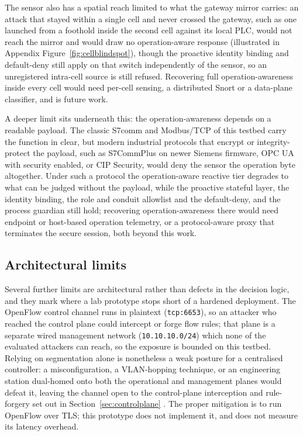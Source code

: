 The sensor also has a spatial reach limited to what the gateway mirror carries: an attack that stayed within a single cell and never crossed the gateway, such as one launched from a foothold inside the second cell against its local PLC, would not reach the mirror and would draw no operation-aware response (illustrated in Appendix Figure~\ref{fig:cellblindspot}), though the proactive identity binding and default-deny still apply on that switch independently of the sensor, so an unregistered intra-cell source is still refused. Recovering full operation-awareness inside every cell would need per-cell sensing, a distributed Snort or a data-plane classifier, and is future work.

A deeper limit sits underneath this: the operation-awareness depends on a readable payload. The classic S7comm and Modbus/TCP of this testbed carry the function in clear, but modern industrial protocols that encrypt or integrity-protect the payload, such as S7CommPlus on newer Siemens firmware, OPC UA with security enabled, or CIP Security, would deny the sensor the operation byte altogether. Under such a protocol the operation-aware reactive tier degrades to what can be judged without the payload, while the proactive stateful layer, the identity binding, the role and conduit allowlist and the default-deny, and the process guardian still hold; recovering operation-awareness there would need endpoint or host-based operation telemetry, or a protocol-aware proxy that terminates the secure session, both beyond this work.

\subsection{Architectural limits}

Several further limits are architectural rather than defects in the decision logic, and they mark where a lab prototype stops short of a hardened deployment. The OpenFlow control channel runs in plaintext (\texttt{tcp:6653}), so an attacker who reached the control plane could intercept or forge flow rules; that plane is a separate wired management network (\texttt{10.10.10.0/24}) which none of the evaluated attackers can reach, so the exposure is bounded on this testbed. Relying on segmentation alone is nonetheless a weak posture for a centralised controller: a misconfiguration, a VLAN-hopping technique, or an engineering station dual-homed onto both the operational and management planes would defeat it, leaving the channel open to the control-plane interception and rule-forgery set out in Section~\ref{sec:controlplane} \cite{gardiner2021controller}. The proper mitigation is to run OpenFlow over TLS; this prototype does not implement it, and does not measure its latency overhead.

